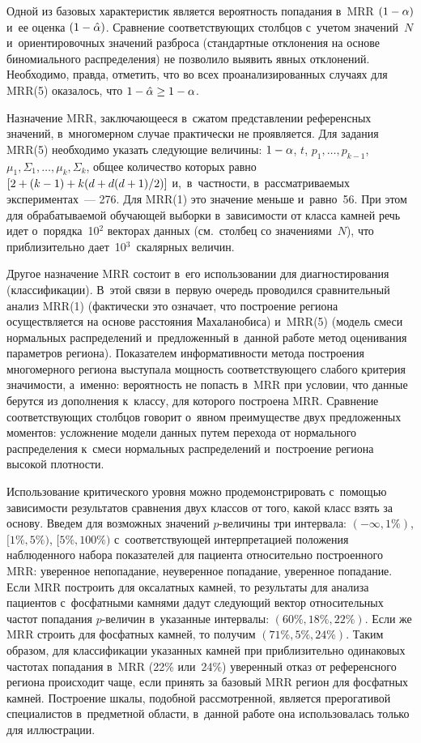\begin{multicols}{2}
     Одной из базовых характеристик является вероятность попадания в~MRR 
$(1\hm-\alpha)$ и~ее оценка $(1\hm-\hat{\alpha})$. Сравнение соответствующих 
столбцов с~учетом значений~$N$ и~ориентировочных значений разброса 
(стандартные отклонения на основе биномиального распределения) не 
позволило выявить явных отклонений. Необходимо, правда, отметить, что во 
всех проанализированных случаях для MRR(5) оказалось, что $1\hm-
\hat{\alpha}\hm\geq 1\hm-\alpha$.
     
     Назначение MRR, заключающееся в~сжатом представлении референсных 
значений, в~многомерном случае практически не проявляется. Для задания 
MRR(5) необходимо указать следующие величины: $1\hm-\alpha$, $t$, 
$p_1,\ldots, p_{k-1}$, $\mu_1, \Sigma_1,\ldots , \mu_k,\Sigma_k$, общее 
количество которых равно  $[2\hm+ (k\hm-1)\hm+ k(d\hm+ d(d\hm+1)/2)]$ 
и,~в~частности, в~рассматриваемых экспериментах~--- 276. Для MRR(1) это 
значение меньше и~равно~56. При этом для обрабатываемой обучающей 
выборки в~зависимости от класса камней речь идет о~порядка~10$^2$ векторах 
данных (см.\ столбец со значениями~$N$), что приблизительно 
дает~10$^3$~скалярных величин.
     
     Другое назначение MRR состоит в~его использовании для 
диагностирования (классификации). В~этой связи в~первую очередь 
проводился сравнительный анализ MRR(1) (фактически это означает, что 
построение региона осуществляется на основе расстояния Махаланобиса) 
и~MRR(5) (модель смеси нормальных распределений и~предложенный 
в~данной работе метод оценивания па\-ра\-мет\-ров региона). Показателем 
информативности метода построения многомерного региона выступала 
мощность соответствующего слабого критерия значимости, а~именно: 
вероятность не попасть в~MRR при условии, что данные берутся из дополнения 
к~классу, для которого построена MRR. Сравнение соответствующих столбцов 
говорит о~явном преимуществе двух предложенных моментов: усложнение 
модели данных путем перехода от нормального распределения к~смеси 
нормальных распределений и~построение региона высокой плотности.
     
     Использование критического уровня можно продемонстрировать  
с~по\-мощью зависимости результатов сравнения двух классов от того, какой 
класс взять за основу. Введем для возможных значений $p$-ве\-ли\-чи\-ны три 
интервала: $(-\infty, 1\%)$, $[1\%, 5\%)$, $[5\%, 100\%)$ с~соответствующей 
интерпретацией положения наблюденного набора показателей для пациента 
относительно построенного MRR: уверенное непопадание, неуверенное 
попадание, уверенное попадание. Если MRR построить для оксалатных камней, 
то результаты для анализа пациентов с~фосфатными камнями дадут следующий 
вектор относительных частот попадания $p$-ве\-ли\-чин в~указанные 
интервалы: $(60\%, 18\%, 22\%)$. Если же MRR строить для фосфатных 
камней, то получим $(71\%, 5\%, 24\%)$. Таким образом, для классификации 
указанных камней при приблизительно одинаковых частотах попадания в~MRR 
(22\% или~24\%) уверенный отказ от референсного региона происходит чаще, 
если принять за базовый MRR регион для фосфатных камней. Построение 
шкалы, подобной рассмотренной, является прерогативой специалистов 
в~предметной области, в~данной работе она использовалась только для 
иллюстрации. 


\end{multicols}
